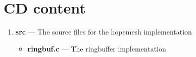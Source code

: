 \chapter{CD content}
\label{chapter:appendix_a}
\begin{enumerate}
\item \textbf{src} --- The source files for the hopemesh implementation

\begin{itemize}
\item \textbf{ringbuf.c} --- The ringbuffer implementation
\end{itemize}

\end{enumerate}

